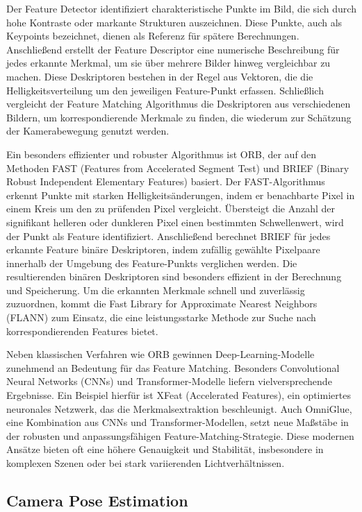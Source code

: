 Der Feature Detector identifiziert charakteristische Punkte im Bild, die sich durch hohe Kontraste oder markante Strukturen auszeichnen. Diese Punkte, auch als Keypoints bezeichnet, dienen als Referenz für spätere Berechnungen. Anschließend erstellt der Feature Descriptor eine numerische Beschreibung für jedes erkannte Merkmal, um sie über mehrere Bilder hinweg vergleichbar zu machen. Diese Deskriptoren bestehen in der Regel aus Vektoren, die die Helligkeitsverteilung um den jeweiligen Feature-Punkt erfassen. Schließlich vergleicht der Feature Matching Algorithmus die Deskriptoren aus verschiedenen Bildern, um korrespondierende Merkmale zu finden, die wiederum zur Schätzung der Kamerabewegung genutzt werden.

Ein besonders effizienter und robuster Algorithmus ist ORB, der auf den Methoden FAST (Features from Accelerated Segment Test) und BRIEF (Binary Robust Independent Elementary Features) basiert. Der FAST-Algorithmus erkennt Punkte mit starken Helligkeitsänderungen, indem er benachbarte Pixel in einem Kreis um den zu prüfenden Pixel vergleicht. Übersteigt die Anzahl der signifikant helleren oder dunkleren Pixel einen bestimmten Schwellenwert, wird der Punkt als Feature identifiziert. Anschließend berechnet BRIEF für jedes erkannte Feature binäre Deskriptoren, indem zufällig gewählte Pixelpaare innerhalb der Umgebung des Feature-Punkts verglichen werden. Die resultierenden binären Deskriptoren sind besonders effizient in der Berechnung und Speicherung. Um die erkannten Merkmale schnell und zuverlässig zuzuordnen, kommt die Fast Library for Approximate Nearest Neighbors (FLANN) zum Einsatz, die eine leistungsstarke Methode zur Suche nach korrespondierenden Features bietet.

Neben klassischen Verfahren wie ORB gewinnen Deep-Learning-Modelle zunehmend an Bedeutung für das Feature Matching. Besonders Convolutional Neural Networks (CNNs) und Transformer-Modelle liefern vielversprechende Ergebnisse. Ein Beispiel hierfür ist XFeat (Accelerated Features), ein optimiertes neuronales Netzwerk, das die Merkmalsextraktion beschleunigt. Auch OmniGlue, eine Kombination aus CNNs und Transformer-Modellen, setzt neue Maßstäbe in der robusten und anpassungsfähigen Feature-Matching-Strategie. Diese modernen Ansätze bieten oft eine höhere Genauigkeit und Stabilität, insbesondere in komplexen Szenen oder bei stark variierenden Lichtverhältnissen.

\subsection{Camera Pose Estimation}

